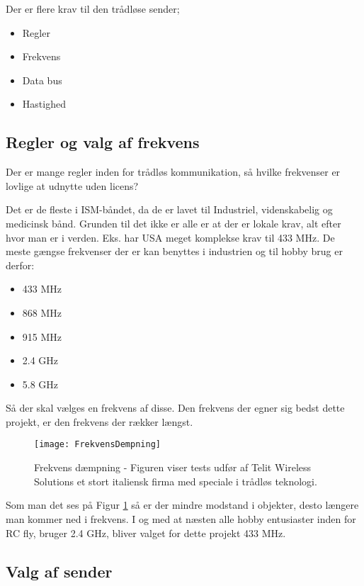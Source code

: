 \documentclass[Main]{subfiles}
\begin{document}
Der er flere krav til den trådløse sender;

\begin{itemize}
\item Regler
\item Frekvens
\item Data bus
\item Hastighed
\end{itemize}

\subsection{Regler og valg af frekvens}
Der er mange regler inden for trådløs kommunikation, så hvilke frekvenser er lovlige at udnytte uden licens?

Det er de fleste i ISM-båndet, da de er lavet til  Industriel, videnskabelig og medicinsk bånd. Grunden til det ikke er alle er at der er lokale krav, alt efter hvor man er i verden. Eks. har USA meget komplekse krav til 433 MHz\cite[s. 32]{Lov1}.
De meste gængse frekvenser der er kan benyttes i industrien og til hobby brug er derfor:

\begin{itemize}
\item 433 MHz
\item 868 MHz
\item 915 MHz
\item 2.4 GHz
\item 5.8 GHz
\end{itemize}

Så der skal vælges en frekvens af disse.
Den frekvens der egner sig bedst dette projekt, er den frekvens der rækker længst. 

\begin{figure}[H]
\centering
\texttt{[image: FrekvensDempning]}
\caption{Frekvens dæmpning - Figuren viser tests udfør af Telit Wireless Solutions\cite[s. 43]{Telit} et stort italiensk firma med speciale i trådløs teknologi.}
\label{Fig:dempning}
\end{figure}


Som man det ses på Figur \ref{Fig:dempning} så er der mindre modstand i objekter, desto længere man kommer ned i frekvens.
I og med at næsten alle hobby entusiaster inden for RC fly, bruger 2.4 GHz, bliver valget for dette projekt 433 MHz.



\subsection{Valg af sender}
\end{document}
